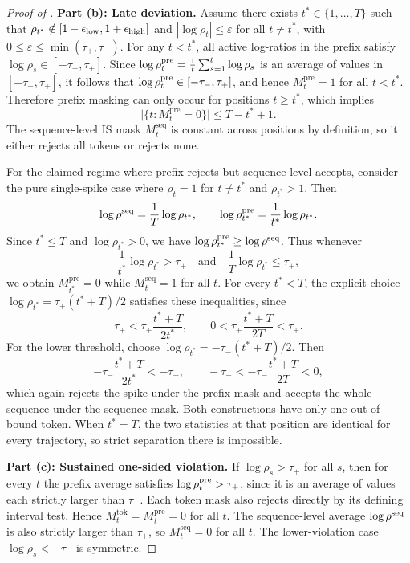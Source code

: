 \begin{proof}[Proof of ]
\par
\noindent\textbf{Part (b): Late deviation.}
Assume there exists $t^*\in\{1,\ldots,T\}$ such that $\rho_{t^*}\notin[1-\epsilon_{\mathrm{low}},1+\epsilon_{\mathrm{high}}]$ and $|\log\rho_t|\le \varepsilon$
for all $t\neq t^*$, with
$0 \le \varepsilon \le \min(\tau_+,\tau_-)$. For any $t<t^*$, all active log-ratios in the prefix satisfy $\log\rho_s \in [-\tau_-,\tau_+]$.
Since $\log\rho_{t}^{\mathrm{pre}} = \frac{1}{t}\sum_{s=1}^{t}\log\rho_s$ is an average of values in $[-\tau_-,\tau_+]$, it follows that
$\log\rho_{t}^{\mathrm{pre}} \in [-\tau_-,\tau_+]$, and hence $M_t^{\mathrm{pre}}=1$ for all $t<t^*$. Therefore prefix masking can only occur
for positions $t\ge t^*$, which implies
\begin{equation*}
    \big|\{t : M_t^{\mathrm{pre}} = 0\}\big| \le T - t^* + 1.
\end{equation*}
The sequence-level IS mask $M_t^{\mathrm{seq}}$ is constant across positions by definition, so it either rejects all tokens or rejects none.

For the claimed regime where prefix rejects but sequence-level accepts, consider the pure single-spike case where $\rho_t=1$ for
$t\neq t^*$ and $\rho_{t^*}>1$. Then
\[
    \log\rho^{\mathrm{seq}} = \frac{1}{T}\log\rho_{t^*},
    \qquad
    \log\rho_{t^*}^{\mathrm{pre}} = \frac{1}{t^*}\log\rho_{t^*}.
\]
Since $t^* \le T$ and $\log\rho_{t^*}>0$, we have $\log\rho_{t^*}^{\mathrm{pre}} \ge \log\rho^{\mathrm{seq}}$. Thus whenever
\begin{equation*}
    \frac{1}{t^*}\log\rho_{t^*} > \tau_+
    \quad\text{and}\quad
    \frac{1}{T}\log\rho_{t^*} \le \tau_+,
\end{equation*}
we obtain $M_{t^*}^{\mathrm{pre}}=0$ while $M_t^{\mathrm{seq}}=1$ for all $t$.
For every $t^*<T$, the explicit choice
$\log\rho_{t^*}=\tau_+(t^*+T)/2$ satisfies these inequalities, since
\[
    \tau_+ < \tau_+\frac{t^*+T}{2t^*},
    \qquad
    0 < \tau_+\frac{t^*+T}{2T} < \tau_+.
\]
For the lower threshold, choose $\log\rho_{t^*}=-\tau_-(t^*+T)/2$. Then
\[
    -\tau_-\frac{t^*+T}{2t^*}< -\tau_-,
    \qquad
    -\tau_- < -\tau_-\frac{t^*+T}{2T}<0,
\]
which again rejects the spike under the prefix mask and accepts the whole
sequence under the sequence mask. Both constructions have only one
out-of-bound token. When $t^*=T$, the two statistics at that position are
identical for every trajectory, so strict separation there is impossible.

\par
\noindent\textbf{Part (c): Sustained one-sided violation.}
If $\log\rho_s > \tau_+$ for all $s$, then for every $t$ the prefix average satisfies $\log\rho_{t}^{\mathrm{pre}} > \tau_+$, since it is an
average of values each strictly larger than $\tau_+$. Each token mask also rejects directly by its defining interval test.
Hence $M_t^{\mathrm{tok}}=M_t^{\mathrm{pre}}=0$ for all $t$. The sequence-level average
$\log\rho^{\mathrm{seq}}$ is also strictly larger than $\tau_+$, so $M_t^{\mathrm{seq}}=0$ for all $t$. The lower-violation case $\log\rho_s < -\tau_-$
is symmetric.
\end{proof}

